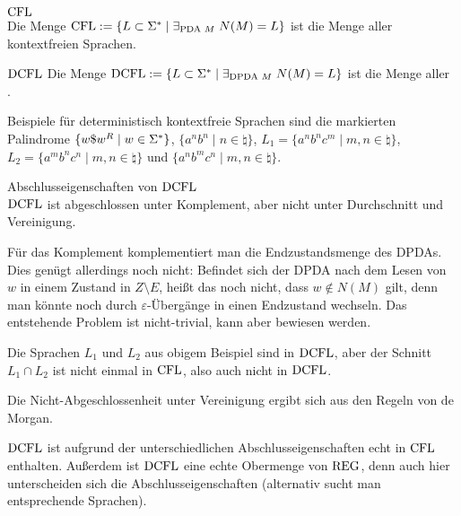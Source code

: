 \linie

\begin{Def}{$\text{CFL}$}\\
    Die Menge $\text{CFL} := \{L \subset \Sigma^\ast \;|\;
    \exists_{\text{PDA } M}\; N(M) = L\}$
    ist die Menge aller kontextfreien Sprachen.
\end{Def}

\begin{Def}{$\text{DCFL}$}
    Die Menge $\text{DCFL} := \{L \subset \Sigma^\ast \;|\;
    \exists_{\text{DPDA } M}\; N(M) = L\}$
    ist die Menge aller\\
    .
\end{Def}

\begin{Bsp}
    Beispiele für deterministisch kontextfreie Sprachen sind
    die markierten Palindrome $\{w \$ w^R \;|\; w \in \Sigma^\ast\}$,
    $\{a^n b^n \;|\; n \in \natural\}$,
    $L_1 = \{a^n b^n c^m \;|\; m, n \in \natural\}$,
    $L_2 = \{a^m b^n c^n \;|\; m, n \in \natural\}$ und
    $\{a^n b^m c^n \;|\; m, n \in \natural\}$.
\end{Bsp}

\linie

\begin{Satz}{Abschlusseigenschaften von $\text{DCFL}$}\\
    $\text{DCFL}$ ist abgeschlossen unter Komplement, aber nicht unter
    Durchschnitt und Vereinigung.
\end{Satz}

\begin{Beweis}
    Für das Komplement komplementiert man die Endzustandsmenge des DPDAs.
    Dies genügt allerdings noch nicht:
    Befindet sich der DPDA nach dem Lesen von $w$ in einem Zustand in
    $Z \setminus E$, heißt das noch nicht, dass $w \notin N(M)$ gilt,
    denn man könnte noch durch $\varepsilon$-Übergänge in einen Endzustand
    wechseln.
    Das entstehende Problem ist nicht-trivial, kann aber bewiesen werden.

    Die Sprachen $L_1$ und $L_2$ aus obigem Beispiel sind in $\text{DCFL}$,
    aber der Schnitt $L_1 \cap L_2$ ist nicht einmal in $\text{CFL}$, also auch
    nicht in $\text{DCFL}$.

    Die Nicht-Abgeschlossenheit unter Vereinigung ergibt sich aus den Regeln
    von de Morgan.
\end{Beweis}

\begin{Bem}
    $\text{DCFL}$ ist aufgrund der unterschiedlichen Abschlusseigenschaften echt in
    $\text{CFL}$ enthalten.
    Außerdem ist $\text{DCFL}$ eine echte Obermenge von $\text{REG}$, denn auch hier
    unterscheiden sich die Abschlusseigenschaften
    (alternativ sucht man entsprechende Sprachen).
\end{Bem}

